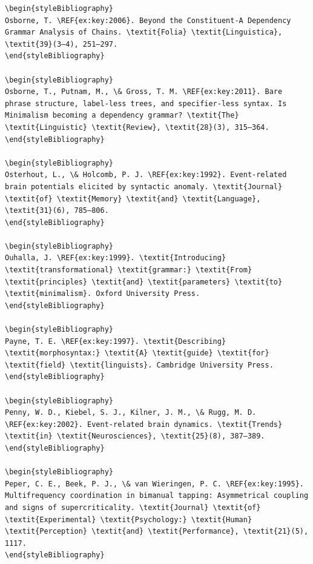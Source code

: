 \begin{verbatim}
\begin{styleBibliography}
Osborne, T. \REF{ex:key:2006}. Beyond the Constituent-A Dependency Grammar Analysis of Chains. \textit{Folia} \textit{Linguistica}, \textit{39}(3–4), 251–297.
\end{styleBibliography}

\begin{styleBibliography}
Osborne, T., Putnam, M., \& Gross, T. M. \REF{ex:key:2011}. Bare phrase structure, label-less trees, and specifier-less syntax. Is Minimalism becoming a dependency grammar? \textit{The} \textit{Linguistic} \textit{Review}, \textit{28}(3), 315–364.
\end{styleBibliography}

\begin{styleBibliography}
Osterhout, L., \& Holcomb, P. J. \REF{ex:key:1992}. Event-related brain potentials elicited by syntactic anomaly. \textit{Journal} \textit{of} \textit{Memory} \textit{and} \textit{Language}, \textit{31}(6), 785–806.
\end{styleBibliography}

\begin{styleBibliography}
Ouhalla, J. \REF{ex:key:1999}. \textit{Introducing} \textit{transformational} \textit{grammar:} \textit{From} \textit{principles} \textit{and} \textit{parameters} \textit{to} \textit{minimalism}. Oxford University Press.
\end{styleBibliography}

\begin{styleBibliography}
Payne, T. E. \REF{ex:key:1997}. \textit{Describing} \textit{morphosyntax:} \textit{A} \textit{guide} \textit{for} \textit{field} \textit{linguists}. Cambridge University Press.
\end{styleBibliography}

\begin{styleBibliography}
Penny, W. D., Kiebel, S. J., Kilner, J. M., \& Rugg, M. D. \REF{ex:key:2002}. Event-related brain dynamics. \textit{Trends} \textit{in} \textit{Neurosciences}, \textit{25}(8), 387–389.
\end{styleBibliography}

\begin{styleBibliography}
Peper, C. E., Beek, P. J., \& van Wieringen, P. C. \REF{ex:key:1995}. Multifrequency coordination in bimanual tapping: Asymmetrical coupling and signs of supercriticality. \textit{Journal} \textit{of} \textit{Experimental} \textit{Psychology:} \textit{Human} \textit{Perception} \textit{and} \textit{Performance}, \textit{21}(5), 1117.
\end{styleBibliography}


\end{verbatim}
